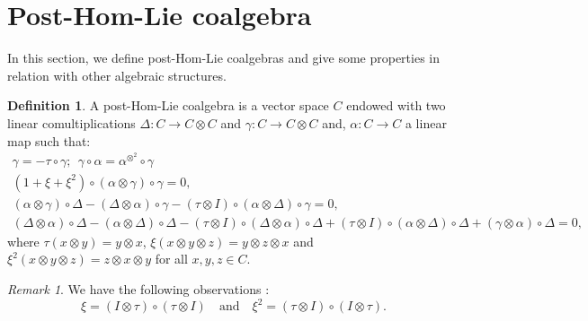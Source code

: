 \documentclass{article}
\theoremstyle{definition}
\newtheorem{defn}[thm]{Definition}
\theoremstyle{remark}
\newtheorem{rem}[thm]{Remark}
\numberwithin{equation}{section}
\begin{document}
\section{Post-Hom-Lie coalgebra}
In this section, we define post-Hom-Lie coalgebras and give some properties in relation with other algebraic structures.
\begin{defn}\label{tdd}
 A post-Hom-Lie coalgebra is a vector space $C$ endowed with two linear comultiplications $\Delta : C\rightarrow C\otimes C$ and $\gamma : C\rightarrow C\otimes C$ and, $\alpha : C\rightarrow C$ a linear map such that:
\begin{eqnarray}
 \gamma=-\tau\circ\gamma;\ \ \gamma\circ\alpha= \alpha^{\otimes^{2}}\circ\gamma\hspace{7cm} \label{dplc1}
 \\
(1+\xi+\xi^2)\circ(\alpha\otimes\gamma)\circ\gamma=0,\hspace{6cm}\label{dplc2}\\
(\alpha\otimes\gamma)\circ\Delta-(\Delta\otimes \alpha)\circ\gamma-(\tau\otimes I)\circ(\alpha\otimes\Delta)\circ\gamma=0,\hspace{4cm}\label{dplc3}\\
(\Delta\otimes \alpha)\circ\Delta\!-\!(\alpha\otimes\Delta)\circ\Delta\!-\!(\tau\otimes I)\circ(\Delta\otimes \alpha)\circ\Delta\!
+\!(\tau\otimes I)\circ(\alpha\otimes\Delta)\circ\Delta\!+\!(\gamma\otimes \alpha)\circ\Delta=0,\label{dplc4}
\end{eqnarray}
where $\tau(x\otimes y)=y\otimes x$, $\xi(x\otimes y\otimes z)=y\otimes z\otimes x$ and $\xi^2(x\otimes y\otimes z)=z\otimes x\otimes y$ for all $x, y,z\in C$.
\end{defn}

\begin{rem}
We have the following observations :
 $$\xi=(I\otimes \tau)\circ(\tau\otimes I)\quad\mbox{and}\quad \xi^2=(\tau\otimes I)\circ(I\otimes\tau).$$
\end{rem}
\end{document}
